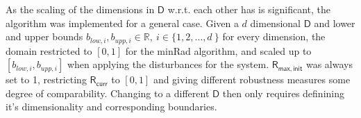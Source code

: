     As the scaling of the dimensions in $\mathsf{D}$ w.r.t. each other has is significant, the algorithm was implemented for a general case. Given a $d$ dimensional $\mathsf{D}$ and lower and upper bounds $b_{low,i}, b_{upp,i} \in \mathbb{R},\ i \in \{1,2,\ldots,d\ \}$ for every dimension, the domain restricted to $[0,1]$ for the minRad algorithm, and scaled up to $[b_{low,i}, b_{upp,i}]$ when applying the disturbances for the system. $\mathsf{R_{max,init}}$ was always set to 1, restricting $\mathsf{R_{curr}}$ to $[0,1]$ and giving different robustness measures some degree of comparability. 
    Changing to a different $\mathsf{D}$ then only requires definining it's dimensionality and corresponding boundaries.



    



